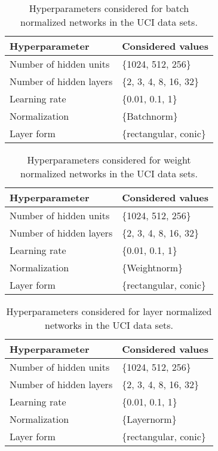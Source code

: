 \documentclass{article}
\begin{document}
\begin{table}[htp]
\begin{center}
\caption{Hyperparameters considered for batch normalized networks in the UCI data sets.}

\begin{tabular}{ll}
\toprule
Hyperparameter  & Considered values \\ 
\midrule
  Number of hidden units & \{1024, 512, 256\} \\
  Number of hidden layers & \{2, 3, 4, 8, 16, 32\} \\
  Learning rate & \{0.01, 0.1, 1\} \\
  Normalization & \{Batchnorm\} \\
  Layer form & \{rectangular, conic\} \\
\bottomrule
\end{tabular}
\end{center}

\end{table}



\begin{table}[htp]
\begin{center}
\caption{Hyperparameters considered for weight normalized networks in the UCI data sets.}

\begin{tabular}{ll}
\toprule
Hyperparameter  & Considered values \\ 
\midrule
  Number of hidden units & \{1024, 512, 256\} \\
  Number of hidden layers & \{2, 3, 4, 8, 16, 32\} \\
  Learning rate & \{0.01, 0.1, 1\} \\
  Normalization & \{Weightnorm\} \\
  Layer form & \{rectangular, conic\} \\
\bottomrule
\end{tabular}
\end{center}

\end{table}



\begin{table}[htp]
\begin{center}
\caption{Hyperparameters considered for layer normalized networks in the UCI data sets.}

\begin{tabular}{ll}
\toprule
Hyperparameter  & Considered values \\ 
\midrule
  Number of hidden units & \{1024, 512, 256\} \\
  Number of hidden layers & \{2, 3, 4, 8, 16, 32\} \\
  Learning rate & \{0.01, 0.1, 1\} \\
  Normalization & \{Layernorm\} \\
  Layer form & \{rectangular, conic\} \\

\bottomrule
\end{tabular}
\end{center}

\end{table}
\end{document}
